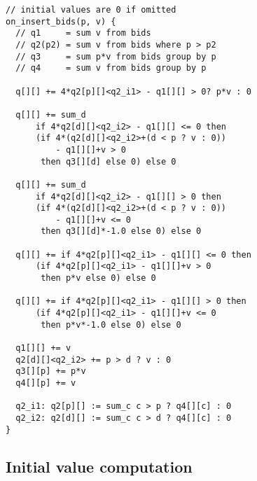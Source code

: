 \begin{verbatim}
// initial values are 0 if omitted
on_insert_bids(p, v) {
  // q1     = sum v from bids
  // q2(p2) = sum v from bids where p > p2
  // q3     = sum p*v from bids group by p
  // q4     = sum v from bids group by p

  q[][] += 4*q2[p][]<q2_i1> - q1[][] > 0? p*v : 0
  
  q[][] += sum_d
      if 4*q2[d][]<q2_i2> - q1[][] <= 0 then
      (if 4*(q2[d][]<q2_i2>+(d < p ? v : 0))
          - q1[][]+v > 0
       then q3[][d] else 0) else 0
  
  q[][] += sum_d
      if 4*q2[d][]<q2_i2> - q1[][] > 0 then
      (if 4*(q2[d][]<q2_i2>+(d < p ? v : 0))
          - q1[][]+v <= 0
       then q3[][d]*-1.0 else 0) else 0
  
  q[][] += if 4*q2[p][]<q2_i1> - q1[][] <= 0 then
      (if 4*q2[p][]<q2_i1> - q1[][]+v > 0
       then p*v else 0) else 0
  
  q[][] += if 4*q2[p][]<q2_i1> - q1[][] > 0 then
      (if 4*q2[p][]<q2_i1> - q1[][]+v <= 0 
       then p*v*-1.0 else 0) else 0

  q1[][] += v
  q2[d][]<q2_i2> += p > d ? v : 0 
  q3[][p] += p*v
  q4[][p] += v
  
  q2_i1: q2[p][] := sum_c c > p ? q4[][c] : 0
  q2_i2: q2[d][] := sum_c c > d ? q4[][c] : 0
}
\end{verbatim}

\subsection{Initial value computation}

